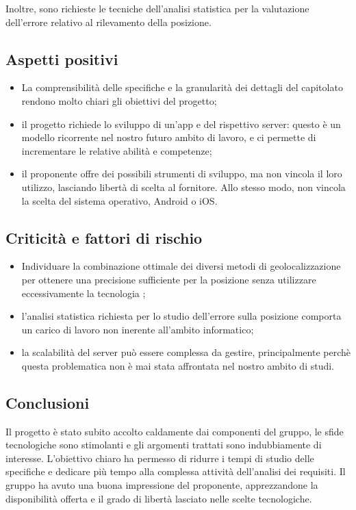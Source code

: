 \documentclass[../studio-di-fattibilita.tex]{subfiles}
\begin{document}
  Inoltre, sono richieste le tecniche dell'analisi statistica per la valutazione dell'errore relativo al rilevamento della posizione.


  \subsection{Aspetti positivi}%
  \label{subsec:aspetti_positivi}
  \begin{itemize}
    \item La comprensibilità delle specifiche e la granularità dei dettagli del capitolato rendono molto chiari gli obiettivi del progetto;
    \item il progetto richiede lo sviluppo di un'app e del rispettivo server: questo è un modello ricorrente nel nostro futuro ambito di lavoro, e ci permette di incrementare le relative abilità e competenze;
    \item il proponente offre dei possibili strumenti di sviluppo, ma non vincola il loro utilizzo, lasciando libertà di scelta al fornitore. Allo stesso modo, non vincola la scelta del sistema operativo, Android o iOS.
  \end{itemize}


  \subsection{Criticità e fattori di rischio}%
  \label{subsec:criticita_e_fattori_di_rischio}
  \begin{itemize}
    \item Individuare la combinazione ottimale dei diversi metodi di geolocalizzazione per ottenere una precisione sufficiente per la posizione senza utilizzare eccessivamente la tecnologia ;
    \item l'analisi statistica richiesta per lo studio dell'errore sulla posizione comporta un carico di lavoro non inerente all'ambito informatico;
    \item la scalabilità del server può essere complessa da gestire, principalmente perchè questa problematica non è mai stata affrontata nel nostro ambito di studi.
  \end{itemize}


  \subsection{Conclusioni}%
  \label{subsec:conclusioni}
  Il progetto è stato subito accolto caldamente dai componenti del gruppo, le sfide tecnologiche sono stimolanti e gli argomenti trattati sono indubbiamente di interesse. L'obiettivo chiaro ha permesso di ridurre i tempi di studio delle specifiche e dedicare più tempo alla complessa attività dell'analisi dei requisiti. Il gruppo ha avuto una buona impressione del proponente, apprezzandone la disponibilità offerta e il grado di libertà lasciato nelle scelte tecnologiche.
\end{document}
